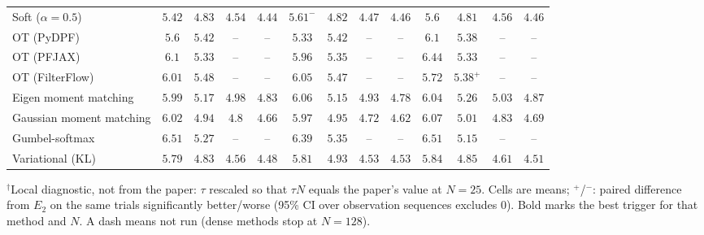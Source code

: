 \begin{table}[ht]
\begin{adjustbox}{max width=\linewidth}
\begin{tabular}{lcccc|cccc|cccc}
Soft ($\alpha{=}0.5$) & $\mathbf{5.42}$ & $4.83$ & $4.54$ & $\mathbf{4.44}$ & $5.61^{-}$ & $4.82$ & $\mathbf{4.47}$ & $4.46$ & $5.6$ & $\mathbf{4.81}$ & $4.56$ & $4.46$ \\
OT (PyDPF) & $5.6$ & $5.42$ & -- & -- & $\mathbf{5.33}$ & $5.42$ & -- & -- & $6.1$ & $\mathbf{5.38}$ & -- & -- \\
OT (PFJAX) & $6.1$ & $5.33$ & -- & -- & $\mathbf{5.96}$ & $5.35$ & -- & -- & $6.44$ & $\mathbf{5.33}$ & -- & -- \\
OT (FilterFlow) & $6.01$ & $5.48$ & -- & -- & $6.05$ & $5.47$ & -- & -- & $\mathbf{5.72}$ & $\mathbf{5.38}^{+}$ & -- & -- \\
Eigen moment matching & $\mathbf{5.99}$ & $5.17$ & $4.98$ & $4.83$ & $6.06$ & $\mathbf{5.15}$ & $\mathbf{4.93}$ & $\mathbf{4.78}$ & $6.04$ & $5.26$ & $5.03$ & $4.87$ \\
Gaussian moment matching & $6.02$ & $\mathbf{4.94}$ & $4.8$ & $4.66$ & $\mathbf{5.97}$ & $4.95$ & $\mathbf{4.72}$ & $\mathbf{4.62}$ & $6.07$ & $5.01$ & $4.83$ & $4.69$ \\
Gumbel-softmax & $6.51$ & $5.27$ & -- & -- & $\mathbf{6.39}$ & $5.35$ & -- & -- & $6.51$ & $\mathbf{5.15}$ & -- & -- \\
Variational (KL) & $\mathbf{5.79}$ & $\mathbf{4.83}$ & $4.56$ & $\mathbf{4.48}$ & $5.81$ & $4.93$ & $\mathbf{4.53}$ & $4.53$ & $5.84$ & $4.85$ & $4.61$ & $4.51$ \\
\bottomrule
\end{tabular}
\end{adjustbox}
\par\smallskip\parbox{0.95\linewidth}{\footnotesize $^\dagger$Local diagnostic, not from the paper: $\tau$ rescaled so that $\tau N$ equals the paper's value at $N{=}25$. Cells are means; $^{+}$/$^{-}$: paired difference from $E_2$ on the same trials significantly better/worse (95\% CI over observation sequences excludes 0). Bold marks the best trigger for that method and $N$. A dash means not run (dense methods stop at $N{=}128$).}
\end{table}


